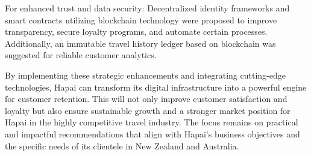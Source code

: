\documentclass{article}
\begin{document}
For enhanced trust and data security: Decentralized identity frameworks  and smart contracts  utilizing blockchain technology were proposed to improve transparency, secure loyalty programs, and automate certain processes. Additionally, an immutable travel history ledger based on blockchain was suggested for reliable customer analytics.


By implementing these strategic enhancements and integrating cutting-edge technologies, Hapai can transform its digital infrastructure into a powerful engine for customer retention. This will not only improve customer satisfaction and loyalty but also ensure sustainable growth and a stronger market position for Hapai in the highly competitive travel industry. The focus remains on practical and impactful recommendations that align with Hapai's business objectives and the specific needs of its clientele in New Zealand and Australia.

  
  
\end{document}
